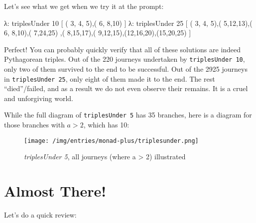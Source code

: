 \documentclass[]{article}
\newenvironment{Shaded}{}{}
\newcommand{\DecValTok}[1]{\textcolor[rgb]{0.25,0.63,0.44}{{#1}}}
\newcommand{\FunctionTok}[1]{\textcolor[rgb]{0.02,0.16,0.49}{{#1}}}
\newcommand{\NormalTok}[1]{{#1}}
\begin{document}
Let's see what we get when we try it at the prompt:

\begin{Shaded}
\begin{Highlighting}[]
\NormalTok{λ}\FunctionTok{:} \NormalTok{triplesUnder }\DecValTok{10}
\NormalTok{[ ( }\DecValTok{3}\NormalTok{, }\DecValTok{4}\NormalTok{, }\DecValTok{5}\NormalTok{),( }\DecValTok{6}\NormalTok{, }\DecValTok{8}\NormalTok{,}\DecValTok{10}\NormalTok{) ]}
\NormalTok{λ}\FunctionTok{:} \NormalTok{triplesUnder }\DecValTok{25}
\NormalTok{[ ( }\DecValTok{3}\NormalTok{, }\DecValTok{4}\NormalTok{, }\DecValTok{5}\NormalTok{),( }\DecValTok{5}\NormalTok{,}\DecValTok{12}\NormalTok{,}\DecValTok{13}\NormalTok{),( }\DecValTok{6}\NormalTok{, }\DecValTok{8}\NormalTok{,}\DecValTok{10}\NormalTok{),( }\DecValTok{7}\NormalTok{,}\DecValTok{24}\NormalTok{,}\DecValTok{25}\NormalTok{)}
 \NormalTok{,( }\DecValTok{8}\NormalTok{,}\DecValTok{15}\NormalTok{,}\DecValTok{17}\NormalTok{),( }\DecValTok{9}\NormalTok{,}\DecValTok{12}\NormalTok{,}\DecValTok{15}\NormalTok{),(}\DecValTok{12}\NormalTok{,}\DecValTok{16}\NormalTok{,}\DecValTok{20}\NormalTok{),(}\DecValTok{15}\NormalTok{,}\DecValTok{20}\NormalTok{,}\DecValTok{25}\NormalTok{) ]}
\end{Highlighting}
\end{Shaded}

Perfect! You can probably quickly verify that all of these solutions are
indeed Pythagorean triples. Out of the 220 journeys undertaken by
\texttt{triplesUnder\ 10}, only two of them survived to the end to be
successful. Out of the 2925 journeys in \texttt{triplesUnder\ 25}, only
eight of them made it to the end. The rest ``died''/failed, and as a
result we do not even observe their remains. It is a cruel and
unforgiving world.

While the full diagram of \texttt{triplesUnder\ 5} has 35 branches, here
is a diagram for those branches with \(a > 2\), which has 10:

\begin{figure}[htbp]
\centering
\texttt{[image: /img/entries/monad-plus/triplesunder.png]}
\caption{\emph{triplesUnder 5}, all journeys (where a \textgreater{} 2)
illustrated}
\end{figure}

\section{Almost There!}\label{almost-there}

Let's do a quick review:
\end{document}
